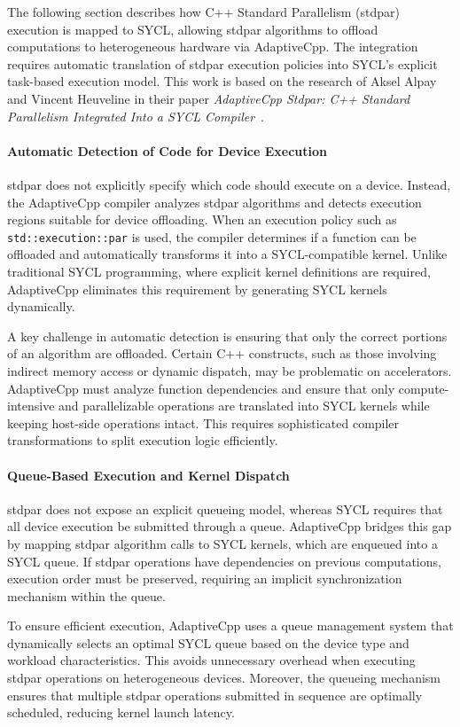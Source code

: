 The following section describes how C++ Standard Parallelism (stdpar) execution is mapped to SYCL, allowing
stdpar algorithms to offload computations to heterogeneous hardware via AdaptiveCpp. The integration requires
automatic translation of stdpar execution policies into SYCL’s explicit task-based execution model. This work is
based on the research of Aksel Alpay and Vincent Heuveline in their paper \textit{AdaptiveCpp Stdpar: C++ Standard
Parallelism Integrated Into a SYCL Compiler}~\cite{alpay2021}.

\paragraph{Automatic Detection of Code for Device Execution}
stdpar does not explicitly specify which code should execute on a device. Instead, the AdaptiveCpp compiler
analyzes stdpar algorithms and detects execution regions suitable for device offloading. When an execution
policy such as \texttt{std::execution::par} is used, the compiler determines if a function can be offloaded and
automatically transforms it into a SYCL-compatible kernel. Unlike traditional SYCL programming, where explicit
kernel definitions are required, AdaptiveCpp eliminates this requirement by generating SYCL kernels dynamically.

A key challenge in automatic detection is ensuring that only the correct portions of an algorithm are offloaded.
Certain C++ constructs, such as those involving indirect memory access or dynamic dispatch, may be problematic
on accelerators. AdaptiveCpp must analyze function dependencies and ensure that only compute-intensive and
parallelizable operations are translated into SYCL kernels while keeping host-side operations intact. This requires
sophisticated compiler transformations to split execution logic efficiently.

\paragraph{Queue-Based Execution and Kernel Dispatch}
stdpar does not expose an explicit queueing model, whereas SYCL requires that all device execution be submitted
through a queue. AdaptiveCpp bridges this gap by mapping stdpar algorithm calls to SYCL kernels, which are
enqueued into a SYCL queue. If stdpar operations have dependencies on previous computations, execution order
must be preserved, requiring an implicit synchronization mechanism within the queue.

To ensure efficient execution, AdaptiveCpp uses a queue management system that dynamically selects an optimal
SYCL queue based on the device type and workload characteristics. This avoids unnecessary overhead when
executing stdpar operations on heterogeneous devices. Moreover, the queueing mechanism ensures that
multiple stdpar operations submitted in sequence are optimally scheduled, reducing kernel launch latency.

